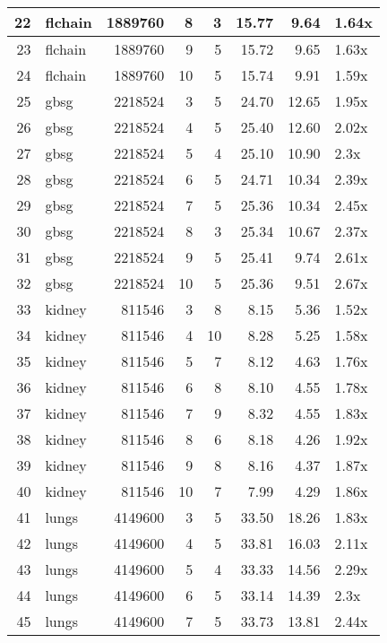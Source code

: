 \begin{table}[ht]
\begin{tabular}{rlrrrrrl}
   \hline
22 & flchain & 1889760 &   8 &   3 & 15.77 & 9.64 & 1.64x \\ 
   \hline
23 & flchain & 1889760 &   9 &   5 & 15.72 & 9.65 & 1.63x \\ 
   \hline
24 & flchain & 1889760 &  10 &   5 & 15.74 & 9.91 & 1.59x \\ 
   \hline
25 & gbsg & 2218524 &   3 &   5 & 24.70 & 12.65 & 1.95x \\ 
   \hline
26 & gbsg & 2218524 &   4 &   5 & 25.40 & 12.60 & 2.02x \\ 
   \hline
27 & gbsg & 2218524 &   5 &   4 & 25.10 & 10.90 & 2.3x \\ 
   \hline
28 & gbsg & 2218524 &   6 &   5 & 24.71 & 10.34 & 2.39x \\ 
   \hline
29 & gbsg & 2218524 &   7 &   5 & 25.36 & 10.34 & 2.45x \\ 
   \hline
30 & gbsg & 2218524 &   8 &   3 & 25.34 & 10.67 & 2.37x \\ 
   \hline
31 & gbsg & 2218524 &   9 &   5 & 25.41 & 9.74 & 2.61x \\ 
   \hline
32 & gbsg & 2218524 &  10 &   5 & 25.36 & 9.51 & 2.67x \\ 
   \hline
33 & kidney & 811546 &   3 &   8 & 8.15 & 5.36 & 1.52x \\ 
   \hline
34 & kidney & 811546 &   4 &  10 & 8.28 & 5.25 & 1.58x \\ 
   \hline
35 & kidney & 811546 &   5 &   7 & 8.12 & 4.63 & 1.76x \\ 
   \hline
36 & kidney & 811546 &   6 &   8 & 8.10 & 4.55 & 1.78x \\ 
   \hline
37 & kidney & 811546 &   7 &   9 & 8.32 & 4.55 & 1.83x \\ 
   \hline
38 & kidney & 811546 &   8 &   6 & 8.18 & 4.26 & 1.92x \\ 
   \hline
39 & kidney & 811546 &   9 &   8 & 8.16 & 4.37 & 1.87x \\ 
   \hline
40 & kidney & 811546 &  10 &   7 & 7.99 & 4.29 & 1.86x \\ 
   \hline
41 & lungs & 4149600 &   3 &   5 & 33.50 & 18.26 & 1.83x \\ 
   \hline
42 & lungs & 4149600 &   4 &   5 & 33.81 & 16.03 & 2.11x \\ 
   \hline
43 & lungs & 4149600 &   5 &   4 & 33.33 & 14.56 & 2.29x \\ 
   \hline
44 & lungs & 4149600 &   6 &   5 & 33.14 & 14.39 & 2.3x \\ 
   \hline
45 & lungs & 4149600 &   7 &   5 & 33.73 & 13.81 & 2.44x \\ 

\end{tabular}
\end{table}
